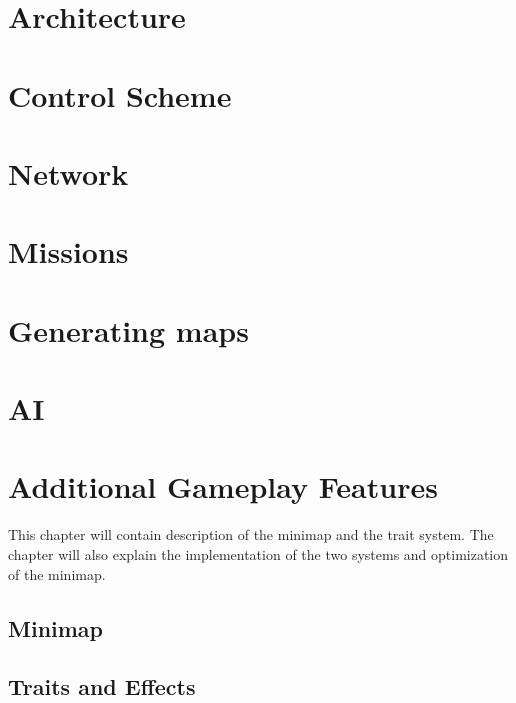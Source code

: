 \chapter{Architecture}


\chapter{Control Scheme}



\chapter{Network}


\chapter{Missions}\label{chapter:modules:missions}


\chapter{Generating maps}


\chapter{AI}


\chapter{Additional Gameplay Features}
This chapter will contain description of the minimap and the trait system. 
The chapter will also explain the implementation of the two systems and optimization of the minimap.
\section{Minimap}


\section{Traits and Effects}

